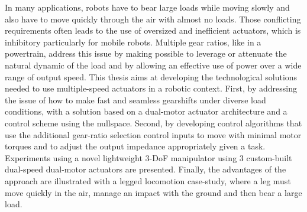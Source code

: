 In many applications, robots have to bear large loads while moving slowly and also have to move quickly through the air with almost no loads. Those conflicting requirements often leads to the use of oversized and inefficient actuators, which is inhibitory particularly for mobile robots. Multiple gear ratios, like in a powertrain, address this issue by making possible to leverage or attenuate the natural dynamic of the load and by allowing an effective use of power over a wide range of output speed. This thesis aims at developing the technological solutions needed to use multiple-speed actuators in a robotic context. First, by addressing the issue of how to make fast and seamless gearshifts under diverse load conditions, with a solution based on a dual-motor actuator architecture and a control scheme using the nullspace. Second, by developing control algorithms that use the additional gear-ratio selection control inputs to move with minimal motor torques and to adjust the output impedance appropriately given a task. Experiments using a novel lightweight 3-DoF manipulator using 3 custom-built dual-speed dual-motor actuators are presented. Finally, the advantages of the approach are illustrated with a legged locomotion case-study, where a leg must move quickly in the air, manage an impact with the ground and then bear a large load.
